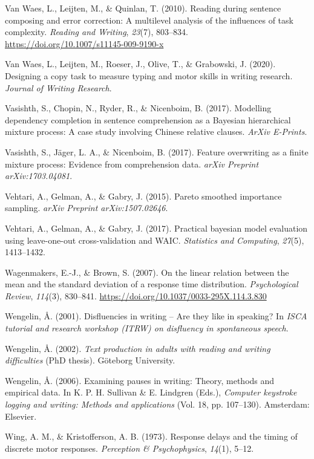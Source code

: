 \documentclass[english,man,floatsintext]{apa7}
\begin{document}
\leavevmode\hypertarget{ref-van2010reading}{}%
Van Waes, L., Leijten, M., \& Quinlan, T. (2010). Reading during sentence composing and error correction: A multilevel analysis of the influences of task complexity. \emph{Reading and Writing}, \emph{23}(7), 803--834. \url{https://doi.org/10.1007/s11145-009-9190-x}

\leavevmode\hypertarget{ref-waes2019}{}%
Van Waes, L., Leijten, M., Roeser, J., Olive, T., \& Grabowski, J. (2020). Designing a copy task to measure typing and motor skills in writing research. \emph{Journal of Writing Research}.

\leavevmode\hypertarget{ref-vasishth2017}{}%
Vasishth, S., Chopin, N., Ryder, R., \& Nicenboim, B. (2017). Modelling dependency completion in sentence comprehension as a Bayesian hierarchical mixture process: A case study involving Chinese relative clauses. \emph{ArXiv E-Prints}.

\leavevmode\hypertarget{ref-vasishth2017feature}{}%
Vasishth, S., Jäger, L. A., \& Nicenboim, B. (2017). Feature overwriting as a finite mixture process: Evidence from comprehension data. \emph{arXiv Preprint arXiv:1703.04081}.

\leavevmode\hypertarget{ref-vehtari2015pareto}{}%
Vehtari, A., Gelman, A., \& Gabry, J. (2015). Pareto smoothed importance sampling. \emph{arXiv Preprint arXiv:1507.02646}.

\leavevmode\hypertarget{ref-vehtari2017practical}{}%
Vehtari, A., Gelman, A., \& Gabry, J. (2017). Practical bayesian model evaluation using leave-one-out cross-validation and WAIC. \emph{Statistics and Computing}, \emph{27}(5), 1413--1432.

\leavevmode\hypertarget{ref-wagenmakers2007linear}{}%
Wagenmakers, E.-J., \& Brown, S. (2007). On the linear relation between the mean and the standard deviation of a response time distribution. \emph{Psychological Review}, \emph{114}(3), 830--841. \url{https://doi.org/10.1037/0033-295X.114.3.830}

\leavevmode\hypertarget{ref-wengelin2001disfluencies}{}%
Wengelin, Å. (2001). Disfluencies in writing -- Are they like in speaking? In \emph{ISCA tutorial and research workshop (ITRW) on disfluency in spontaneous speech}.

\leavevmode\hypertarget{ref-wen02}{}%
Wengelin, Å. (2002). \emph{Text production in adults with reading and writing difficulties} (PhD thesis). Göteborg University.

\leavevmode\hypertarget{ref-wen06}{}%
Wengelin, Å. (2006). Examining pauses in writing: Theory, methods and empirical data. In K. P. H. Sullivan \& E. Lindgren (Eds.), \emph{Computer keystroke logging and writing: Methods and applications} (Vol. 18, pp. 107--130). Amsterdam: Elsevier.

\leavevmode\hypertarget{ref-wing1973response}{}%
Wing, A. M., \& Kristofferson, A. B. (1973). Response delays and the timing of discrete motor responses. \emph{Perception \& Psychophysics}, \emph{14}(1), 5--12.
\end{document}
